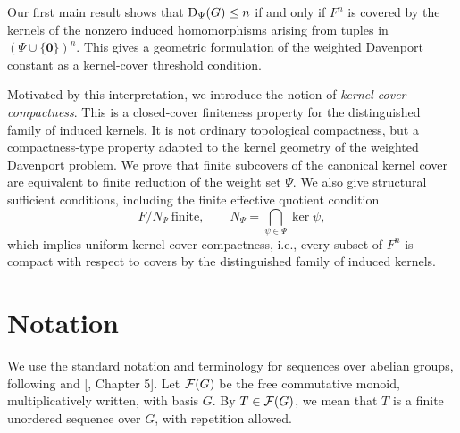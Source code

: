 \documentclass[a4paper, 12pt]{article}
\begin{document}
Our first main result shows that
${\rm D}_{\Psi}(G)\leq n$
if and only if \(F^n\) is covered by the kernels of the nonzero induced
homomorphisms arising from tuples in $(\Psi\cup\{\mathbf 0\})^n.$
This gives a geometric formulation of the weighted Davenport constant as
a kernel-cover threshold condition.

Motivated by this interpretation, we introduce the notion of
\emph{kernel-cover compactness}.  This is a closed-cover finiteness
property for the distinguished family of induced kernels.  It is not
ordinary topological compactness, but a compactness-type property adapted
to the kernel geometry of the weighted Davenport problem.  We prove that
finite subcovers of the canonical kernel cover are equivalent to finite
reduction of the weight set \(\Psi\).  We also give structural sufficient
conditions, including the finite effective quotient condition
$$
F/N_{\Psi}\ \text{finite},
\qquad
N_{\Psi}=\bigcap_{\psi\in\Psi}\ker\psi,
$$
which implies uniform kernel-cover compactness, i.e., every subset of $F^n$ is compact with respect to covers by the distinguished family
of induced kernels.

\section {Notation}

We use the standard notation and terminology for sequences over abelian
groups, following \cite{GaoGeroldingersurvey} and [\cite{GH}, Chapter 5]. Let ${\cal F}(G)$
be the free commutative monoid, multiplicatively written, with basis
$G$. By $T\in {\cal F}(G)$, we mean that $T$ is a finite unordered sequence over $G$, with
repetition allowed.
\end{document}
